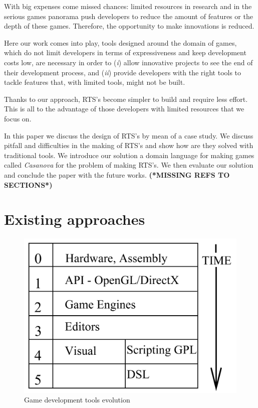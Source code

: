 With big expenses come missed chances: limited resources in research and in the serious games panorama push developers to reduce the amount of features or the depth of these games. Therefore, the opportunity to make innovations is reduced. 

Here our work comes into play, tools designed around the domain of games, which do not limit developers in terms of expressiveness and keep development costs low, are necessary in order to (\textit{i}) allow innovative projects to see the end of their development process, and (\textit{ii}) provide developers with the right tools to tackle features that, with limited tools, might not be built.

\vspace{0.25cm}
\noindent{}

\vspace{0.25cm}
\noindent
Thanks to our approach, RTS's become simpler to build and require less effort. This is all to the advantage of those developers with limited resources that we focus on.


In this paper we discuss the design of RTS's by mean of a case study. We discuss pitfall and difficulties in the making of RTS's and show how are they solved with traditional tools. We introduce our solution a domain language for making games called \textit{Casanova} for the problem of making RTS's. We then evaluate our solution and conclude the paper with the future works. \textbf{(*MISSING REFS TO SECTIONS*)}

\section{Existing approaches}
\begin{figure}[!h]
\centering
\includegraphics[scale=0.5]{game_development_evolution.png}
\caption{Game development tools evolution}\label{game_dvelopment}
\end{figure}